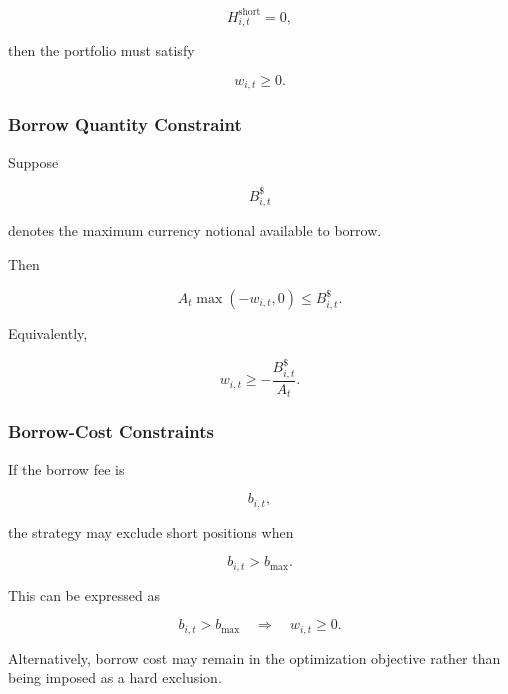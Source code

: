 \documentclass[11pt,a4paper]{article}
\begin{document}
\begin{equation}
H_{i,t}^{\mathrm{short}}=0,
\end{equation}

then the portfolio must satisfy

\begin{equation}
\boxed{
w_{i,t}
\geq
0.
}
\end{equation}


\subsubsection{Borrow Quantity Constraint}

Suppose

\begin{equation}
B_{i,t}^{\$}
\end{equation}

denotes the maximum currency notional available to borrow.

Then

\begin{equation}
A_t
\max(-w_{i,t},0)
\leq
B_{i,t}^{\$}.
\end{equation}

Equivalently,

\begin{equation}
\boxed{
w_{i,t}
\geq
-
\frac{
B_{i,t}^{\$}
}{
A_t
}.
}
\end{equation}


\subsubsection{Borrow-Cost Constraints}

If the borrow fee is

\begin{equation}
b_{i,t},
\end{equation}

the strategy may exclude short positions when

\begin{equation}
b_{i,t}>b_{\max}.
\end{equation}

This can be expressed as

\begin{equation}
b_{i,t}>b_{\max}
\quad\Rightarrow\quad
w_{i,t}\geq0.
\end{equation}

Alternatively, borrow cost may remain in the optimization objective rather than
being imposed as a hard exclusion.
\end{document}
